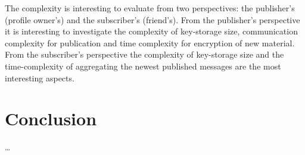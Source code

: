 The complexity is interesting to evaluate from two perspectives: the 
publisher's (profile owner's) and the subscriber's (friend's).
From the publisher's perspective it is interesting to investigate the 
complexity of key-storage size, communication complexity for publication and 
time complexity for encryption of new material.
From the subscriber's perspective the complexity of key-storage size and the 
time-complexity of aggregating the newest published messages are the most 
interesting aspects.


\section{Conclusion}
\dots





\begin{frame}
\printbibliography{}
\end{frame}
